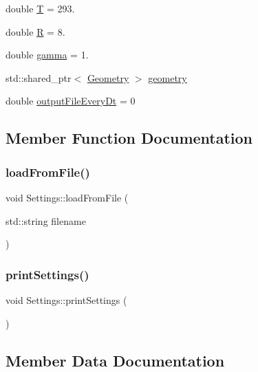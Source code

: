 \begin{DoxyCompactItemize}
double \mbox{\hyperlink{structSettings_a255c7c5f048ccaeb00206462d3530240}{T}} = 293.
\item 
double \mbox{\hyperlink{structSettings_ad23422f52cc720203901b5d03605070b}{R}} = 8.
\item 
double \mbox{\hyperlink{structSettings_a626bd5aa12e49526b8a87ae6df5db79c}{gamma}} = 1.
\item 
std\+::shared\+\_\+ptr$<$ \mbox{\hyperlink{classGeometry}{Geometry}} $>$ \mbox{\hyperlink{structSettings_ad8be2c34e77ce3ef9eb995a28eac3b3e}{geometry}}
\item 
double \mbox{\hyperlink{structSettings_a0e6a7871fa07786983bfcd08835122a0}{output\+File\+Every\+Dt}} = 0
\end{DoxyCompactItemize}


\subsection{Member Function Documentation}
\mbox{\label{structSettings_a55f95e3b6e7379bef4f8399a2cd670cc}} 
\subsubsection{\texorpdfstring{loadFromFile()}{loadFromFile()}}
{\footnotesize\ttfamily void Settings\+::load\+From\+File (\begin{DoxyParamCaption}\item[{std\+::string}]{filename }\end{DoxyParamCaption})}

\mbox{\label{structSettings_a68ce38117dcef2cbdd3bd17f127b3078}} 
\subsubsection{\texorpdfstring{printSettings()}{printSettings()}}
{\footnotesize\ttfamily void Settings\+::print\+Settings (\begin{DoxyParamCaption}{ }\end{DoxyParamCaption})}



\subsection{Member Data Documentation}
\mbox{\label{structSettings_ada065d4ba81dd3d37f1c91267b631f30}} 
